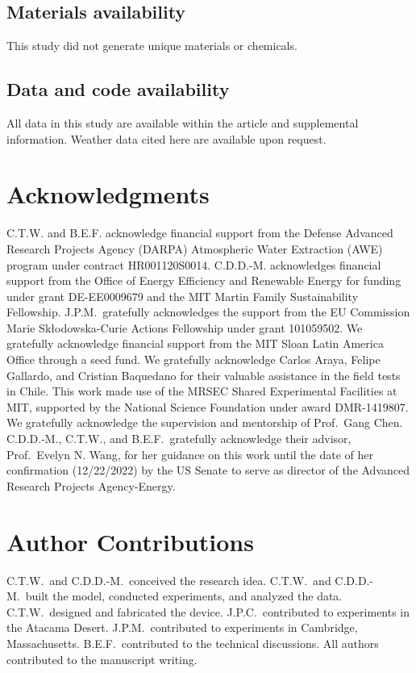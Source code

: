 \documentclass[11pt]{article}
\begin{document}
\subsection*{Materials availability}
This study did not generate unique materials or chemicals.

\subsection*{Data and code availability}
All data in this study are available within the article and supplemental information. Weather data cited here are available upon request.

\section*{Acknowledgments}
C.T.W. and B.E.F. acknowledge financial support from the Defense Advanced Research Projects Agency (DARPA) Atmospheric Water Extraction (AWE) program under contract HR001120S0014. C.D.D.-M. acknowledges financial support from the Office of Energy Efficiency and Renewable Energy for funding under grant DE-EE0009679 and the MIT Martin Family Sustainability Fellowship. J.P.M.\ gratefully acknowledges the support from the EU Commission Marie Sk{\l}odowska-Curie Actions Fellowship under grant 101059502. We gratefully acknowledge financial support from the MIT Sloan Latin America Office through a seed fund. We gratefully acknowledge Carlos Araya, Felipe Gallardo, and Cristian Baquedano for their valuable assistance in the field tests in Chile. This work made use of the MRSEC Shared Experimental Facilities at MIT, supported by the National Science Foundation under award DMR-1419807. We gratefully acknowledge the supervision and mentorship of Prof.\ Gang Chen. C.D.D.-M., C.T.W., and B.E.F.\ gratefully acknowledge their advisor, Prof.\ Evelyn N. Wang, for her guidance on this work until the date of her confirmation (12/22/2022) by the US Senate to serve as director of the Advanced Research Projects Agency-Energy.

\section*{Author Contributions}
C.T.W.\ and C.D.D.-M.\ conceived the research idea. C.T.W.\ and C.D.D.-M.\ built the model, conducted experiments, and analyzed the data. C.T.W.\ designed and fabricated the device. J.P.C.\ contributed to experiments in the Atacama Desert. J.P.M.\ contributed to experiments in Cambridge, Massachusetts. B.E.F.\ contributed to the technical discussions. All authors contributed to the manuscript writing.
\end{document}
